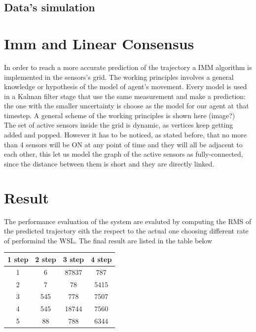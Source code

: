 \documentclass[twocolumn]{article}
\begin{document}
    \subsection*{Data's simulation}

    \section*{Imm and Linear Consensus}
    In order to reach a more accurate prediction of the trajectory a IMM algorithm is implemented in the sensors's grid. The working principles 
    involves a general knowledge or hypothesis of the model of agent's movement. Every model is used in a Kalman filter stage that use the same measurement and make
    a prediction: the one with the smaller uncertainty is choose as the model for our agent at that timestep. A general scheme of the working principles is shown here (image?)
    \\
    The set of active sensors inside the grid is dynamic, as vertices keep getting added and popped. However it has to be noticed, as stated before, that no 
     more than 4 sensors will be ON at any point of time and they will all be adjacent to each other, this let us model the graph of the active 
     sensors as fully-connected, since the distance between them is short and they are directly linked.
    \\
    \section*{Result}
    The performance evaluation of the system are evaluted by computing the RMS of the predicted trajectory eith the respect to the actual one
    choosing different rate of performind the WSL. The final result are listed in the table below


    \begin{center}
        \begin{tabular}{||c c c c||}
            \hline
            1 step & 2 step & 3 step & 4 step \\ [0.5ex]
            \hline\hline
            1      & 6      & 87837  & 787    \\
            \hline
            2      & 7      & 78     & 5415   \\
            \hline
            3      & 545    & 778    & 7507   \\
            \hline
            4      & 545    & 18744  & 7560   \\
            \hline
            5      & 88     & 788    & 6344   \\ [1ex]
            \hline
        \end{tabular}
    \end{center}


    \subsection*{}
\end{document}
